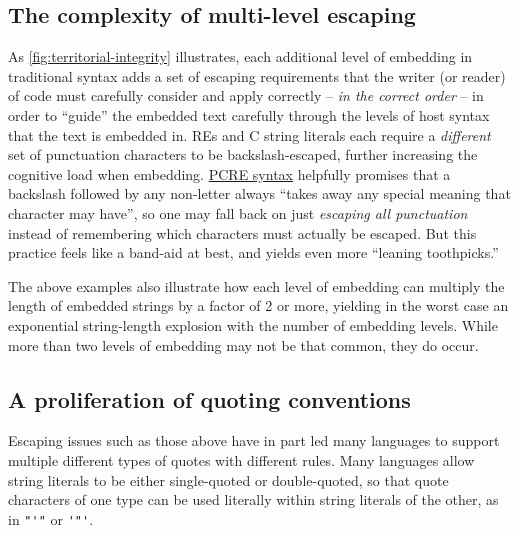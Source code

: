 \subsection{The complexity of multi-level escaping}

As \cref{fig:territorial-integrity} illustrates,
each additional level of embedding in traditional syntax
adds a set of escaping requirements that the writer (or reader) of code
must carefully consider and apply correctly --
\emph{in the correct order} --
in order to ``guide'' the embedded text carefully
through the levels of host syntax that the text is embedded in.
REs and C string literals each require
a \emph{different} set of punctuation characters to be backslash-escaped,
further increasing the cognitive load when embedding.
\href{https://www.pcre.org/original/doc/html/pcrepattern.html}{PCRE syntax}
helpfully promises that a backslash followed by any non-letter
always ``takes away any special meaning that character may have'',
so one may fall back on just \emph{escaping all punctuation}
instead of remembering which characters must actually be escaped.
But this practice feels like a band-aid at best,
and yields even more ``leaning toothpicks.''

The above examples also illustrate how each level of embedding
can multiply the length of embedded strings by a factor of 2 or more,
yielding in the worst case
an exponential string-length explosion with the number of embedding levels.
While more than two levels of embedding may not be that common,
they do occur.


\subsection{A proliferation of quoting conventions}

Escaping issues such as those above have in part led many languages
to support multiple different types of quotes with different rules.
Many languages allow string literals
to be either single-quoted or double-quoted,
so that quote characters of one type can be used literally
within string literals of the other,
as in \verb|"'"| or \verb|'"'|.

